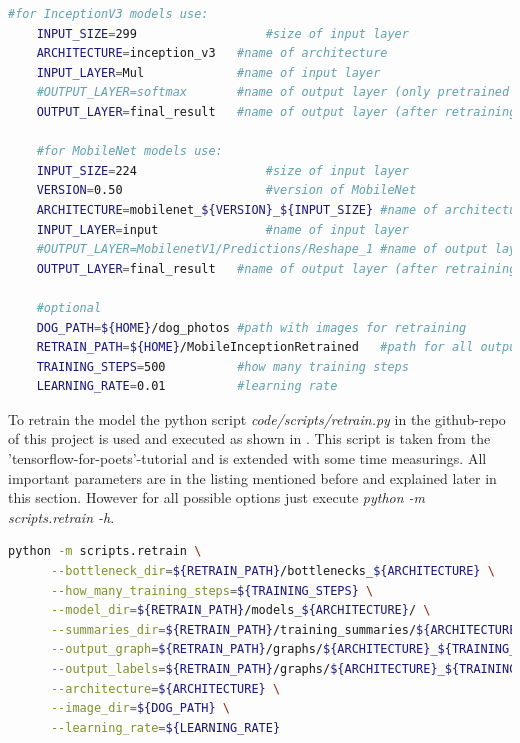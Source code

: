 \begin{minipage}{\linewidth}
\begin{lstlisting}[caption=Defining terminal variables, label=list:variables, language=bash]
	#for InceptionV3 models	use:
	INPUT_SIZE=299					#size of input layer
	ARCHITECTURE=inception_v3	#name of architecture
	INPUT_LAYER=Mul				#name of input layer
	#OUTPUT_LAYER=softmax		#name of output layer (only pretrained model)
	OUTPUT_LAYER=final_result	#name of output layer (after retraining)
	
	#for MobileNet models use:
	INPUT_SIZE=224					#size of input layer
	VERSION=0.50					#version of MobileNet
	ARCHITECTURE=mobilenet_${VERSION}_${INPUT_SIZE}	#name of architecture
	INPUT_LAYER=input	 			#name of input layer
	#OUTPUT_LAYER=MobilenetV1/Predictions/Reshape_1	#name of output layer (only pretrained model)
	OUTPUT_LAYER=final_result	#name of output layer (after retraining)
	
	#optional
	DOG_PATH=${HOME}/dog_photos	#path with images for retraining
	RETRAIN_PATH=${HOME}/MobileInceptionRetrained	#path for all output data
	TRAINING_STEPS=500			#how many training steps
	LEARNING_RATE=0.01			#learning rate
\end{lstlisting}
\end{minipage}

To retrain the model the python script \textit{code/scripts/retrain.py} in the github-repo of this project is used and executed as shown in . This script is taken from the 'tensorflow-for-poets'-tutorial and is extended with some time measurings. All important parameters are in the listing mentioned before and explained later in this section. However for all possible options just execute \textit{python -m scripts.retrain -h}. 

\begin{minipage}{\linewidth}
\begin{lstlisting}[caption=Call of \textit{retrain.py}, label=list:retrain, language=bash]
	python -m scripts.retrain \
	  --bottleneck_dir=${RETRAIN_PATH}/bottlenecks_${ARCHITECTURE} \
	  --how_many_training_steps=${TRAINING_STEPS} \
	  --model_dir=${RETRAIN_PATH}/models_${ARCHITECTURE}/ \
	  --summaries_dir=${RETRAIN_PATH}/training_summaries/${ARCHITECTURE}_${TRAINING_STEPS}/${ARCHITECTURE}_${TRAINING_STEPS}_${LEARNING_RATE} \
	  --output_graph=${RETRAIN_PATH}/graphs/${ARCHITECTURE}_${TRAINING_STEPS}/retrained_dog_graph_${ARCHITECTURE}_${TRAINING_STEPS}_${LEARNING_RATE}.pb \
	  --output_labels=${RETRAIN_PATH}/graphs/${ARCHITECTURE}_${TRAINING_STEPS}/retrained_dog_labels_${ARCHITECTURE}_${TRAINING_STEPS}_${LEARNING_RATE}.txt \
	  --architecture=${ARCHITECTURE} \
	  --image_dir=${DOG_PATH} \
	  --learning_rate=${LEARNING_RATE}
\end{lstlisting}
\end{minipage}

